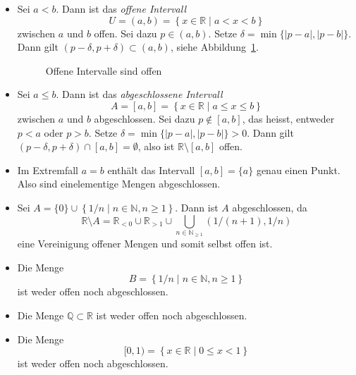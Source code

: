 \documentclass[../main.tex]{subfiles}
\begin{document}
\begin{examples}
  \leavevmode
  \begin{itemize}
    \item Sei
      $a < b$. Dann ist
      das \emph{offene Intervall}
      \[
        U = (a, b) = \left\{x \in \mathbb{R} \mid a < x < b\right\}
      \]
      zwischen $a$ und $b$ offen. Sei dazu $p \in (a, b)$. Setze
      $\delta = \min \{|p - a|, |p - b|\}$.
      Dann gilt
      $(p - \delta, p + \delta) \subset (a, b)$,
      siehe Abbildung~\ref{fig:offen}.
      \begin{figure}[htb]
        \centering
        
        \caption{Offene Intervalle
        sind offen}%
        \label{fig:offen}
      \end{figure}
      
    \item Sei $a \leq b$. Dann ist das \emph{abgeschlossene Intervall}
      \[
        A = [a, b] = \left\{x \in \mathbb{R} \mid a \leq x \leq b\right\}
      \]
      zwischen $a$ und $b$ abgeschlossen.
      Sei dazu $p \notin [a,b]$, das heisst, entweder
      $p < a$ oder $p > b$.
      Setze $\delta = \min \{|p- a|, |p-b|\} > 0$.
      Dann gilt
      $(p - \delta, p + \delta) \cap [a, b] = \emptyset$,
      also ist $\mathbb{R} \setminus [a, b]$ offen.
    \item Im Extremfall $a = b$ enthält das Intervall
      $[a,b] = \{a\}$ genau einen Punkt. Also
      sind einelementige Mengen abgeschlossen.
    \item Sei $A = \{0\} \cup \left\{1/n \mid n \in 
      \mathbb{N}, n \geq 1\right\}$.
      Dann ist $A$ abgeschlossen, da
      \[
        \mathbb{R} \setminus A = \mathbb{R}_{<0} \cup
        \mathbb{R}_{>1} \cup \bigcup_{n \in \mathbb{N}_{\geq 1}}
        \left(1/(n+1), 1/n\right)
      \]
      eine Vereinigung offener Mengen und somit selbst offen ist.
    \item Die Menge
      \[
        B = \left\{1/n \mid n \in \mathbb{N}, n \geq 1\right\}
      \]
      ist weder offen noch abgeschlossen.
    \item Die Menge $\mathbb{Q} \subset \mathbb{R}$ 
      ist weder offen noch abgeschlossen.
    \item Die Menge
      \[
        [0, 1) = \left\{x \in \mathbb{R} \mid 0 \leq%
        x < 1\right\}
      \]
      ist weder offen noch abgeschlossen.
  \end{itemize}
\end{examples}
\end{document}
